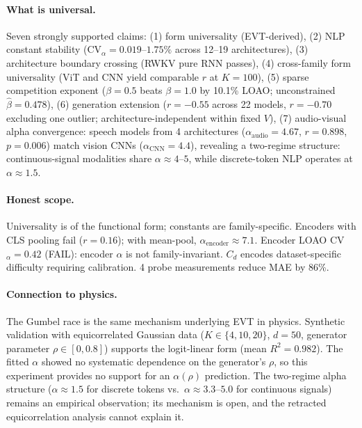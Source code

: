 \documentclass{article}
\begin{document}
\paragraph{What is universal.}
Seven strongly supported claims: (1) form universality (EVT-derived), (2) NLP constant stability (CV$_\alpha=0.019$--$1.75\%$ across 12--19 architectures), (3) architecture boundary crossing (RWKV pure RNN passes), (4) cross-family form universality (ViT and CNN yield comparable $r$ at $K=100$), (5) sparse competition exponent ($\beta=0.5$ beats $\beta=1.0$ by 10.1\% LOAO; unconstrained $\hat\beta=0.478$), (6) generation extension ($r=-0.55$ across 22 models, $r=-0.70$ excluding one outlier; architecture-independent within fixed $V$), (7) audio-visual alpha convergence: speech models from 4 architectures ($\alpha_\mathrm{audio}=4.67$, $r=0.898$, $p=0.006$) match vision CNNs ($\alpha_\mathrm{CNN}=4.4$), revealing a two-regime structure: continuous-signal modalities share $\alpha\approx4$--$5$, while discrete-token NLP operates at $\alpha\approx1.5$.

\paragraph{Honest scope.}
Universality is of the functional form; constants are family-specific.
Encoders with CLS pooling fail ($r=0.16$); with mean-pool, $\alpha_\mathrm{encoder}\approx7.1$.
Encoder LOAO CV$_\alpha=0.42$ (FAIL): encoder $\alpha$ is not family-invariant.
$C_d$ encodes dataset-specific difficulty requiring calibration. 4 probe measurements reduce MAE by 86\%.

\paragraph{Connection to physics.}
The Gumbel race is the same mechanism underlying EVT in physics.
Synthetic validation with equicorrelated Gaussian data ($K\in\{4,10,20\}$, $d=50$, generator parameter $\rho\in[0,0.8]$) supports the logit-linear form (mean $R^2=0.982$). The fitted $\alpha$ showed no systematic dependence on the generator's $\rho$, so this experiment provides no support for an $\alpha(\rho)$ prediction.
The two-regime alpha structure ($\alpha\approx1.5$ for discrete tokens vs.\ $\alpha\approx3.3$--$5.0$ for continuous signals) remains an empirical observation; its mechanism is open, and the retracted equicorrelation analysis cannot explain it.
\end{document}

